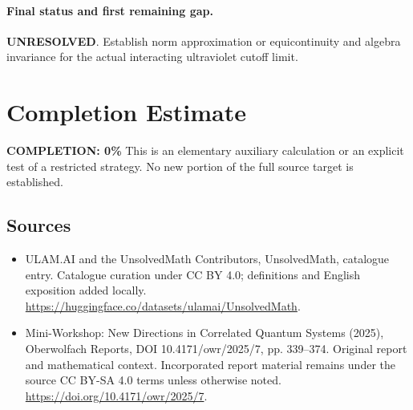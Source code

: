 \documentclass[11pt]{article}
\begin{document}
\paragraph{Final status and first remaining gap.}
\textbf{UNRESOLVED}. Establish norm approximation or equicontinuity and algebra invariance for the actual interacting ultraviolet cutoff limit.

\section{Completion Estimate}
\noindent\textbf{COMPLETION: 0\%}
This is an elementary auxiliary calculation or an explicit test of a restricted strategy. No new portion of the full source target is established.

\subsection{Sources}
\begin{itemize}
\item[\hypertarget{source:statement:1}{S1}] ULAM.AI and the UnsolvedMath Contributors, UnsolvedMath, catalogue entry. Catalogue curation under CC BY 4.0; definitions and English exposition added locally.
\url{https://huggingface.co/datasets/ulamai/UnsolvedMath}.
\item[\hypertarget{source:statement:2}{S2}] Mini-Workshop: New Directions in Correlated Quantum Systems (2025), Oberwolfach Reports, DOI 10.4171/owr/2025/7, pp. 339--374. Original report and mathematical context. Incorporated report material remains under the source CC BY-SA 4.0 terms unless otherwise noted.
\url{https://doi.org/10.4171/owr/2025/7}.
\end{itemize}
\label{end:statement}
\end{document}

